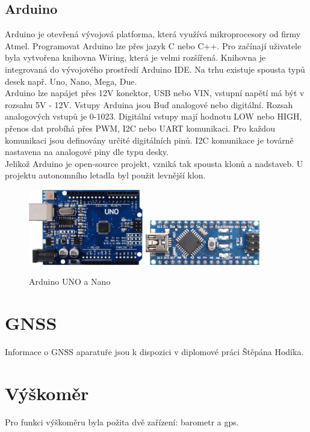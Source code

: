 \subsection{Arduino} 
Arduino je otevřená vývojová platforma, která využívá mikroprocesory od firmy Atmel. Programovat Arduino lze přes jazyk C nebo C++. Pro začínají uživatele byla vytvořena knihovna Wiring, která je velmi rozšířená. Knihovna je integrovaná do vývojového prostředí Arduino IDE. Na trhu existuje spousta typů desek např. Uno, Nano, Mega, Due. \\
Arduino lze napájet přes 12V konektor, USB nebo VIN, vstupní napětí má být v rozsahu 5V - 12V. Vstupy Arduina jsou Buď analogové nebo digitální. Rozsah analogových vstupů je 0-1023. Digitální vstupy mají hodnotu LOW nebo HIGH, přenos dat probíhá přes PWM, I2C nebo UART komunikaci. Pro každou komunikaci jsou definovány určité digitálních pinů. I2C komunikace je továrně nastavena na analogové piny dle typu desky.\\
Jelikož Arduino je open-source projekt, vzniká tak spousta klonů a nadstaveb. U projektu autonomního letadla byl použit levnější klon.\\


\begin{figure}
	\centering
	\includegraphics[width=5cm]{pictures/uno.jpg}
	\includegraphics[width=5cm]{pictures/nano.jpg}
	\caption{Arduino UNO a Nano}
\end{figure}

\section{GNSS}
Informace o GNSS aparatuře jsou k dispozici v diplomové práci Štěpána Hodíka.

\section{Výškoměr}
Pro funkci výškoměru byla požita dvě zařízení: barometr a gps.

